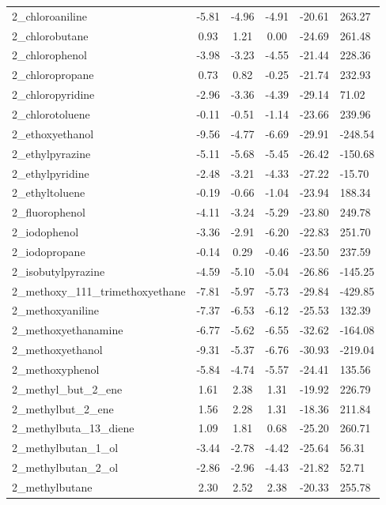 \documentclass{amsart}
\begin{document}
\begin{longtable}{L|C|C|C|X|X}
2\_chloroaniline & -5.81 & -4.96 & -4.91 & -20.61 & 263.27 \\ 
2\_chlorobutane & 0.93 & 1.21 & 0.00 & -24.69 & 261.48 \\ 
2\_chlorophenol & -3.98 & -3.23 & -4.55 & -21.44 & 228.36 \\ 
2\_chloropropane & 0.73 & 0.82 & -0.25 & -21.74 & 232.93 \\ 
2\_chloropyridine & -2.96 & -3.36 & -4.39 & -29.14 & 71.02 \\ 
2\_chlorotoluene & -0.11 & -0.51 & -1.14 & -23.66 & 239.96 \\ 
2\_ethoxyethanol & -9.56 & -4.77 & -6.69 & -29.91 & -248.54 \\ 
2\_ethylpyrazine & -5.11 & -5.68 & -5.45 & -26.42 & -150.68 \\ 
2\_ethylpyridine & -2.48 & -3.21 & -4.33 & -27.22 & -15.70 \\ 
2\_ethyltoluene & -0.19 & -0.66 & -1.04 & -23.94 & 188.34 \\ 
2\_fluorophenol & -4.11 & -3.24 & -5.29 & -23.80 & 249.78 \\ 
2\_iodophenol & -3.36 & -2.91 & -6.20 & -22.83 & 251.70 \\ 
2\_iodopropane & -0.14 & 0.29 & -0.46 & -23.50 & 237.59 \\ 
2\_isobutylpyrazine & -4.59 & -5.10 & -5.04 & -26.86 & -145.25 \\ 
2\_methoxy\_111\_trimethoxyethane & -7.81 & -5.97 & -5.73 & -29.84 & -429.85 \\ 
2\_methoxyaniline & -7.37 & -6.53 & -6.12 & -25.53 & 132.39 \\ 
2\_methoxyethanamine & -6.77 & -5.62 & -6.55 & -32.62 & -164.08 \\ 
2\_methoxyethanol & -9.31 & -5.37 & -6.76 & -30.93 & -219.04 \\ 
2\_methoxyphenol & -5.84 & -4.74 & -5.57 & -24.41 & 135.56 \\ 
2\_methyl\_but\_2\_ene & 1.61 & 2.38 & 1.31 & -19.92 & 226.79 \\ 
2\_methylbut\_2\_ene & 1.56 & 2.28 & 1.31 & -18.36 & 211.84 \\ 
2\_methylbuta\_13\_diene & 1.09 & 1.81 & 0.68 & -25.20 & 260.71 \\ 
2\_methylbutan\_1\_ol & -3.44 & -2.78 & -4.42 & -25.64 & 56.31 \\ 
2\_methylbutan\_2\_ol & -2.86 & -2.96 & -4.43 & -21.82 & 52.71 \\ 
2\_methylbutane & 2.30 & 2.52 & 2.38 & -20.33 & 255.78 \\ 

\end{longtable}
\end{document}
